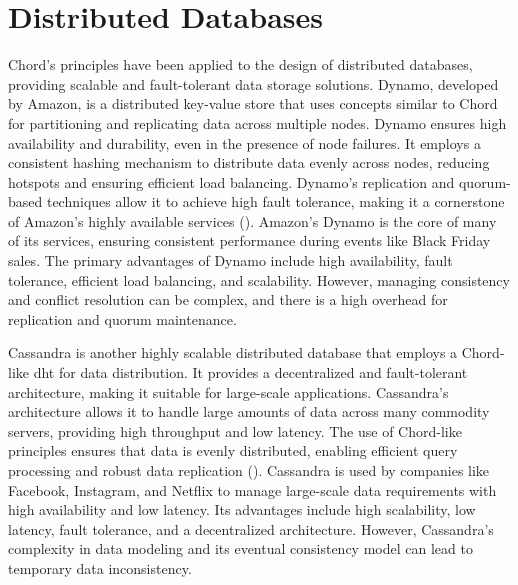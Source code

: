 \section{Distributed Databases}
Chord's principles have been applied to the design of distributed databases, providing scalable and fault-tolerant data storage solutions.
Dynamo, developed by Amazon, is a distributed key-value store that uses concepts similar to Chord for partitioning and replicating data across multiple nodes.
Dynamo ensures high availability and durability, even in the presence of node failures.
It employs a consistent hashing mechanism to distribute data evenly across nodes, reducing hotspots and ensuring efficient load balancing.
Dynamo's replication and quorum-based techniques allow it to achieve high fault tolerance, making it a cornerstone of Amazon's highly available services (\cite{DeCandia2007}).
Amazon's Dynamo is the core of many of its services, ensuring consistent performance during events like Black Friday sales.
The primary advantages of Dynamo include high availability, fault tolerance, efficient load balancing, and scalability.
However, managing consistency and conflict resolution can be complex, and there is a high overhead for replication and quorum maintenance.

Cassandra is another highly scalable distributed database that employs a Chord-like \gls{dht} for data distribution.
It provides a decentralized and fault-tolerant architecture, making it suitable for large-scale applications.
Cassandra's architecture allows it to handle large amounts of data across many commodity servers, providing high throughput and low latency.
The use of Chord-like principles ensures that data is evenly distributed, enabling efficient query processing and robust data replication (\cite{Lakshman2010}).
Cassandra is used by companies like Facebook, Instagram, and Netflix to manage large-scale data requirements with high availability and low latency.
Its advantages include high scalability, low latency, fault tolerance, and a decentralized architecture.
However, Cassandra's complexity in data modeling and its eventual consistency model can lead to temporary data inconsistency.

